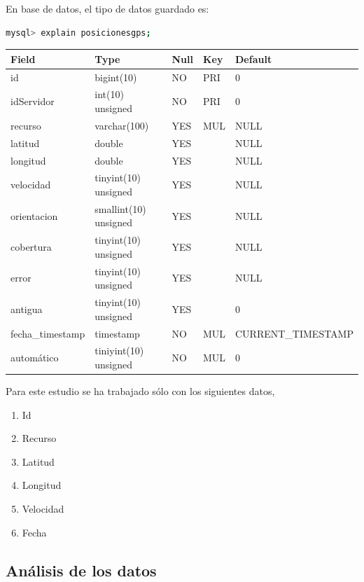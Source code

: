 \documentclass[a4paper, 12pt]{article}
\begin{document}
\smallskip

En base de datos, el tipo de datos guardado es:

\begin{lstlisting}[language=bash, basicstyle=\small, columns=fullflexible]
mysql> explain posicionesgps;
\end{lstlisting}


\begin{center}
	\begin{tabular}{|l|l|l|l|l|}
	\rowcolor{LightCyan}
	\hline
	Field & Type & Null & Key & Default \\
	\hline
	id & bigint(10) & NO &  PRI & 0  \\
	idServidor & int(10) unsigned & NO & PRI & 0 \\
	recurso & varchar(100) & YES & MUL & NULL  \\
	latitud & double & YES & & NULL  \\
	longitud & double & YES & & NULL  \\
	velocidad & tinyint(10) unsigned & YES & & NULL  \\
	orientacion & smallint(10) unsigned & YES  & & NULL  \\
	cobertura & tinyint(10) unsigned & YES  & & NULL \\
	error & tinyint(10) unsigned  & YES & & NULL  \\
	antigua & tinyint(10) unsigned & YES  & & 0  \\
	fecha\_timestamp & timestamp & NO & MUL & CURRENT\_TIMESTAMP \\
	autom\'atico & tiniyint(10) unsigned & NO & MUL & 0  \\
	\hline
	\end{tabular}
\end{center}

\smallskip


Para este estudio se ha trabajado s\'olo con los siguientes datos,\\

\begin{enumerate}
\item Id
\item Recurso
\item Latitud
\item Longitud
\item Velocidad
\item Fecha
\end{enumerate}


\pagebreak
\subsection{An\'alisis de los datos}
\end{document}
